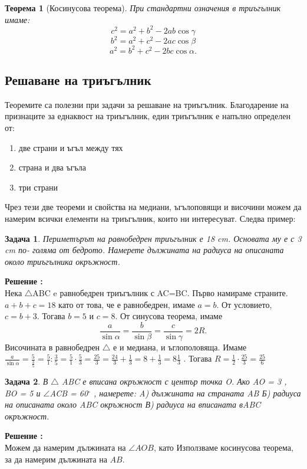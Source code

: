 \documentclass{article}
\newtheorem{problem}{Задача}
\newtheorem{theorem}{Теорема}
\newcounter{solution}
\newcommand\solution{%
	\stepcounter{solution}%
	\textbf{Решение :}\\%
}
\begin{document}
\begin{theorem}[Косинусова теорема]
	При стандартни означения в триъгълник имаме: 
	$$ c^2 = a^2 + b^2 - 2ab \cos \gamma  $$
	$$ b^2 = a^2 + c^2 - 2ac \cos \beta  $$
	$$ a^2 = b^2 + c^2 - 2bc \cos \alpha.  $$
\end{theorem}


\subsection{Решаване на триъгълник}
Теоремите са полезни при задачи за решаване на триъгълник. Благодарение на признаците за еднаквост на триъгълник, един триъгълник е напълно определен от:
\begin{enumerate}
	\item две страни и ъгъл между тях
	\item страна и два ъгъла
	\item три страни
\end{enumerate}
Чрез тези две теореми и свойства на медиани, ъгълоповящи и височини можем да намерим всички елементи на триъгълник, които ни интересуват. Следва пример:

\begin{problem}
	Периметърът на равнобедрен триъгълник е 18 cm. Основата му е с 3 cm по-
	голяма от бедрото. Намерете дължината на радиуса на описаната около триъгълника
	окръжност.
\end{problem}
\solution Нека $\triangle$ABC e равнобедрен триъгълник с AC=BC. Първо намираме страните. $a + b + c = 18$ като от това, че е равнобедрен, имаме $a=b$. От условието, $c = b + 3$. Тогава $b=5$ и $c=8.$ От синусова теорема, имаме 
$$ \frac{a}{\sin \alpha} = \frac{b}{\sin \beta} = \frac{c}{\sin \gamma} = 2R.$$
Височината в равнобедрен $ \triangle$ е и медиана, и ъглополовяща. Имаме
$ \frac{a}{\sin \alpha} =  \frac{5}{\frac{3}{5}} = \frac{5}{1} : \frac{3}{5} = \frac{5}{1} \cdot \frac{5}{3} = \frac{25}{3}= \frac{24}{3} +\frac{1}{3} = 8 + \frac{1}{3} = 8\frac{1}{3}$ .
Тогава $R = \frac{1}{2} \cdot \frac{25}{3} = \frac{25}{6} $

\begin{problem}
	В $\triangle$ ABC е вписана окръжност с център точка O. Ако AO = 3 , BO = 5 и
	$\angle $ACB = 60$^\circ $  , намерете:
	A) дължината на страната AB
	Б) радиуса на описаната около ABC окръжност
	В) радиуса на вписаната вABC окръжност.
\end{problem}
\solution Можем да намерим дължината на $\angle AOB $, като  Използваме косинусова теорема, за да намерим дължината на $AB$.
\end{document}
